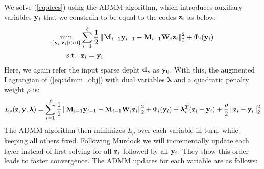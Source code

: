 We solve (\ref{eq:dccs}) using the ADMM algorithm, which introduces auxiliary variables $\mathbf{y}_i$ that we constrain to be equal to the codes $\mathbf{z}_i$ as below:
\begin{equation}
\begin{aligned}
\min_{\{\mathbf{y}_i, \mathbf{z}_i \vert i>0\}} & \sum_{i=1}^{\ell} \frac{1}{2} \left\Vert \mathbf{M}_{i-1}\mathbf{y}_{i-1} - \mathbf{M}_{i-1}\mathbf{W}_i\mathbf{z}_i\right\Vert_2^2 + \Phi_i(\mathbf{y}_i)\\
\text{s.t.~~} & \mathbf{z}_i = \mathbf{y}_i
\end{aligned}
\label{eq:admm_obj}
\end{equation}
Here, we again refer the input sparse depht $\mathbf{d}_s$ as $\mathbf{y}_0$. With this, the augmented Lagrangian of (\ref{eq:admm_obj}) with dual variables $\bm{\lambda}$ and a quadratic penalty weight $\rho$ is:
\begin{equation}
  L_\rho(\mathbf{z}, \mathbf{y}, \bm{\lambda}) = \sum_{i=1}^{\ell} \frac{1}{2} \left\Vert \mathbf{M}_{i-1}\mathbf{y}_{i-1} - \mathbf{M}_{i-1}\mathbf{W}_i\mathbf{z}_i\right\Vert_2^2 + \Phi_i(\mathbf{y}_i) + \bm{\lambda}^T_i(\mathbf{z}_i - \mathbf{y}_i) + \frac{\rho}{2}\left\Vert\mathbf{z}_i - \mathbf{y}_i\right\Vert_2^2
\end{equation}
The ADMM algorithm then minimizes $L_\rho$ over each variable in turn, while keeping all others fixed. Following Murdock \etal we will incrementally update each layer instead of first solving for all $\mathbf{z}_i$ followed by all $\mathbf{y}_i$. They show this order leads to faster convergence. The ADMM updates for each variable are as follows:
